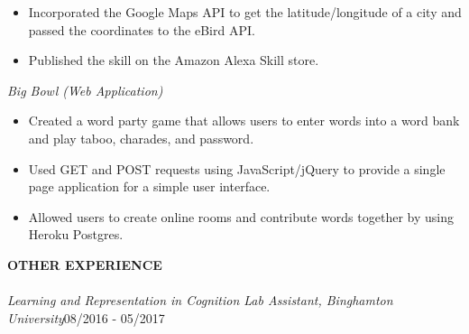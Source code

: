 \documentclass[10.5pt]{res}
\newcommand{\sectionSpace}{\vspace{-3.5pt}}
\newcommand{\itemSpace}{\vspace{-8pt}}
\begin{document}
\begin{resume}
\begin{itemize}
 	\item Incorporated the Google Maps API to get the latitude/longitude of a city and passed the coordinates to the eBird API.
	\item Published the skill on the Amazon Alexa Skill store.
	\end{itemize}
	\itemSpace
{\it Big Bowl (Web Application)}\\ [-11pt]  
	\begin{itemize} \itemsep -1pt %
	\item Created a word party game that allows users to enter words into a word bank and play taboo, charades, and password.
 	\item Used GET and POST requests using JavaScript/jQuery to provide a single page application for a simple user interface.
	\item Allowed users to create online rooms and contribute words together by using Heroku Postgres.
	\end{itemize}
	\sectionSpace

\textbf{OTHER EXPERIENCE} \\ [-10.5pt]
\noindent\makebox[\linewidth]{\rule{\textwidth}{0.4pt}}\\
{\it Learning and Representation in Cognition Lab Assistant, Binghamton University}\hfill 08/2016 - 05/2017 \\ [-15pt]

\end{resume}
\end{document}
